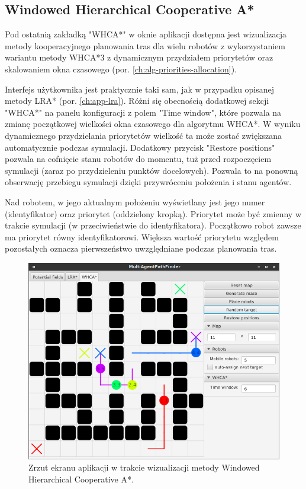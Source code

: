 \subsection{Windowed Hierarchical Cooperative A*}
Pod ostatnią zakładką "WHCA*" w oknie aplikacji dostępna jest wizualizacja metody kooperacyjnego planowania tras dla wielu robotów z wykorzystaniem wariantu metody WHCA*3 z dynamicznym przydziałem priorytetów oraz skalowaniem okna czasowego (por. \ref{ch:alg-priorities-allocation}).

Interfejs użytkownika jest praktycznie taki sam, jak w przypadku opisanej metody LRA* (por. \ref{ch:app-lra}).
Różni się obecnością dodatkowej sekcji "WHCA*" na panelu konfiguracji z polem "Time window", które pozwala na zmianę początkowej wielkości okna czasowego dla algorytmu WHCA*. W wyniku dynamicznego przydzielania priorytetów wielkość ta może zostać zwiększana automatycznie podczas symulacji.
Dodatkowy przycisk "Restore positions" pozwala na cofnięcie stanu robotów do momentu, tuż przed rozpoczęciem symulacji (zaraz po przydzieleniu punktów docelowych). Pozwala to na ponowną obserwację przebiegu symulacji dzięki przywróceniu położenia i stanu agentów.

Nad robotem, w jego aktualnym położeniu wyświetlany jest jego numer (identyfikator) oraz priorytet (oddzielony kropką). Priorytet może być zmienny w trakcie symulacji (w przeciwieństwie do identyfikatora). Początkowo robot zawsze ma priorytet równy identyfikatorowi. Większa wartość priorytetu względem pozostałych oznacza pierwszeństwo uwzględniane podczas planowania tras.

\begin{figure}
	\centering
	\includegraphics[width=0.8\columnwidth]{img/robopath/ui-whca}
	\caption{Zrzut ekranu aplikacji w trakcie wizualizacji metody Windowed Hierarchical Cooperative A*.}
	\label{fig:robopath-ui-whca}
\end{figure}
